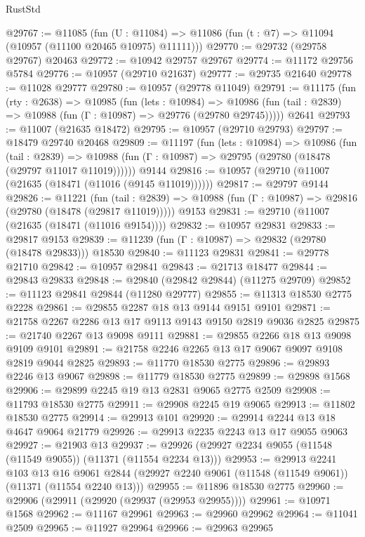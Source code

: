 \begin{lexlean}{RustStd}
\begin{coremodule}
@29767 := @11085
    (fun (U : @11084) => @11086 (fun (t : @7) => @11094 (@10957 (@11100 @20465 @10975) @11111)))
@29770 := @29732 (@29758 @29767) @20463
@29772 := @10942 @29757 @29767
@29774 := @11172 @29756 @5784
@29776 := @10957 (@29710 @21637)
@29777 := @29735 @21640
@29778 := @11028 @29777
@29780 := @10957 (@29778 @11049)
@29791 := @11175
    (fun (rty : @2638) =>
    @10985
      (fun (lets : @10984) =>
      @10986 (fun (tail : @2839) => @10988 (fun (Γ : @10987) => @29776 (@29780 @29745)))))
    @2641
@29793 := @11007 (@21635 @18472)
@29795 := @10957 (@29710 @29793)
@29797 := @18479 @29740 @20468
@29809 := @11197
    (fun (lets : @10984) =>
    @10986
      (fun (tail : @2839) =>
      @10988 (fun (Γ : @10987) => @29795 (@29780 (@18478 (@29797 @11017 @11019))))))
    @9144
@29816 := @10957 (@29710 (@11007 (@21635 (@18471 (@11016 (@9145 @11019))))))
@29817 := @29797 @9144
@29826 := @11221
    (fun (tail : @2839) => @10988 (fun (Γ : @10987) => @29816 (@29780 (@18478 (@29817 @11019)))))
    @9153
@29831 := @29710 (@11007 (@21635 (@18471 (@11016 @9154))))
@29832 := @10957 @29831
@29833 := @29817 @9153
@29839 := @11239 (fun (Γ : @10987) => @29832 (@29780 (@18478 @29833))) @18530
@29840 := @11123 @29831
@29841 := @29778 @21710
@29842 := @10957 @29841
@29843 := @21713 @18477
@29844 := @29843 @29833
@29848 := @29840 (@29842 @29844) (@11275 @29709)
@29852 := @11123 @29841 @29844 (@11280 @29777)
@29855 := @11313 @18530 @2775 @2228
@29861 := @29855 @2287 @18 @13 @9144 @9151 @9101
@29871 := @21758 @2267 @2286 @13 @17 @9113 @9143 @9150 @2819 @9036 @2825
@29875 := @21740 @2267 @13 @9098 @9111
@29881 := @29855 @2266 @18 @13 @9098 @9109 @9101
@29891 := @21758 @2246 @2265 @13 @17 @9067 @9097 @9108 @2819 @9044 @2825
@29893 := @11770 @18530 @2775
@29896 := @29893 @2246 @13 @9067
@29898 := @11779 @18530 @2775
@29899 := @29898 @1568
@29906 := @29899 @2245 @19 @13 @2831 @9065 @2775 @2509
@29908 := @11793 @18530 @2775
@29911 := @29908 @2245 @19 @9065
@29913 := @11802 @18530 @2775
@29914 := @29913 @101
@29920 := @29914 @2244 @13 @18 @4647 @9064 @21779
@29926 := @29913 @2235 @2243 @13 @17 @9055 @9063
@29927 := @21903 @13
@29937 := @29926 (@29927 @2234 @9055 (@11548 (@11549 @9055)) (@11371 (@11554 @2234 @13)))
@29953 := @29913
    @2241
    @103
    @13
    @16
    @9061
    @2844
    (@29927 @2240 @9061 (@11548 (@11549 @9061)) (@11371 (@11554 @2240 @13)))
@29955 := @11896 @18530 @2775
@29960 := @29906 (@29911 (@29920 (@29937 (@29953 @29955))))
@29961 := @10971 @1568
@29962 := @11167 @29961
@29963 := @29960 @29962
@29964 := @11041 @2509
@29965 := @11927 @29964
@29966 := @29963 @29965

\end{coremodule}
\end{lexlean}
